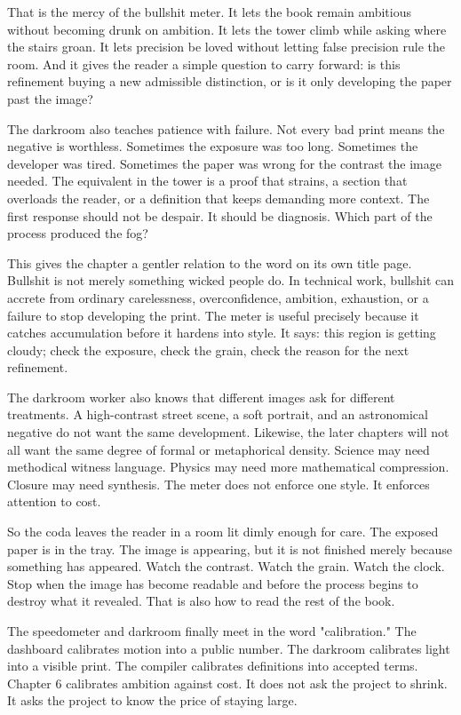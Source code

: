 That is the mercy of the bullshit meter. It lets the book remain ambitious
without becoming drunk on ambition. It lets the tower climb while asking where
the stairs groan. It lets precision be loved without letting false precision
rule the room. And it gives the reader a simple question to carry forward: is
this refinement buying a new admissible distinction, or is it only developing
the paper past the image?

The darkroom also teaches patience with failure. Not every bad print means the
negative is worthless. Sometimes the exposure was too long. Sometimes the
developer was tired. Sometimes the paper was wrong for the contrast the image
needed. The equivalent in the tower is a proof that strains, a section that
overloads the reader, or a definition that keeps demanding more context. The
first response should not be despair. It should be diagnosis. Which part of the
process produced the fog?

This gives the chapter a gentler relation to the word on its own title page.
Bullshit is not merely something wicked people do. In technical work, bullshit
can accrete from ordinary carelessness, overconfidence, ambition, exhaustion,
or a failure to stop developing the print. The meter is useful precisely
because it catches accumulation before it hardens into style. It says: this
region is getting cloudy; check the exposure, check the grain, check the
reason for the next refinement.

The darkroom worker also knows that different images ask for different
treatments. A high-contrast street scene, a soft portrait, and an astronomical
negative do not want the same development. Likewise, the later chapters will
not all want the same degree of formal or metaphorical density. Science may
need methodical witness language. Physics may need more mathematical
compression. Closure may need synthesis. The meter does not enforce one style.
It enforces attention to cost.

So the coda leaves the reader in a room lit dimly enough for care. The exposed
paper is in the tray. The image is appearing, but it is not finished merely
because something has appeared. Watch the contrast. Watch the grain. Watch the
clock. Stop when the image has become readable and before the process begins to
destroy what it revealed. That is also how to read the rest of the book.

The speedometer and darkroom finally meet in the word "calibration." The
dashboard calibrates motion into a public number. The darkroom calibrates light
into a visible print. The compiler calibrates definitions into accepted terms.
Chapter 6 calibrates ambition against cost. It does not ask the project to
shrink. It asks the project to know the price of staying large.

